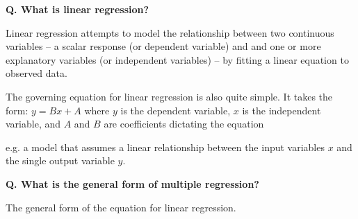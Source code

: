 \begin{frame}[fragile]{\textbf{Q. What is linear regression?}}
  \begin{wideitemize}
  \item Linear regression attempts to model the relationship between two continuous
    variables -- a scalar response (or dependent variable) and and one or more
    explanatory variables (or independent variables) -- by fitting a linear
    equation to observed data.
  \item The governing equation for linear regression is also quite simple. It
    takes the form: $y = Bx + A$ where $y$ is the dependent variable, $x$ is the
    independent variable, and $A$ and $B$ are coefficients dictating the equation
  \item e.g. a model that assumes a linear relationship between the input
    variables $x$ and the single output variable $y$.
  \end{wideitemize}
\end{frame}

\begin{frame}[fragile]{\textbf{Q. What is the general form of multiple regression?}}
  \begin{wideitemize}
    \item The general form of the equation for linear regression.
  \end{wideitemize}
\end{frame}


